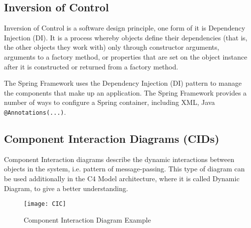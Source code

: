 \subsection{Inversion of Control}
Inversion of Control is a software design principle, one form of it is Dependency Injection (DI). It is a process whereby objects define their dependencies (that is, the other objects they work with) only through constructor arguments, arguments to a factory method, or properties that are set on the object instance after it is constructed or returned from a factory method.

The Spring Framework uses the Dependency Injection (DI) pattern to manage the components that make up an application. The Spring Framework provides a number of ways to configure a Spring container, including XML, Java \lstinline|@Annotations(...)|.

\subsection{Component Interaction Diagrams (CIDs)}
Component Interaction diagrams describe the dynamic interactions between objects in the system, i.e. pattern of message-passing. This type of diagram can be used additionally in the C4 Model architecture, where it is called Dynamic Diagram, to give a better understanding.

\begin{figure}[H]
  \center
  \texttt{[image: CIC]}
  \caption{Component Interaction Diagram Example}
\end{figure}
